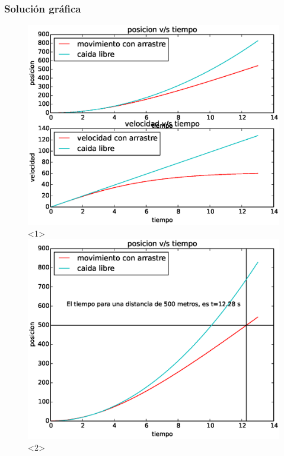 \begin{frame}[fragile]
\frametitle{Solución gráfica}
\begin{figure}
	\centering
	\includegraphics[scale=0.5]{Examen3_P2_01.eps}<1>  
	\includegraphics[scale=0.5]{Examen3_P2_02.eps}<2>
\end{figure}
\end{frame}
